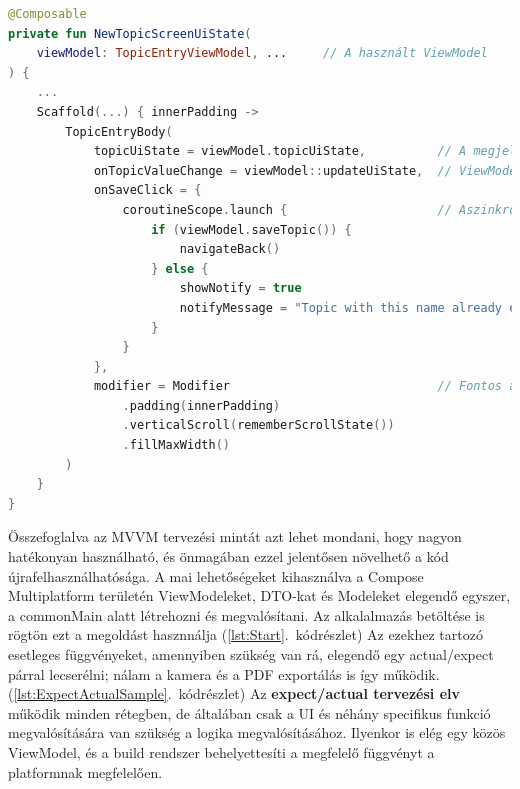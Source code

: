 \begin{lstlisting}[caption={Egy a View rétegbe tartozó felület leírásának részlete}, label={lst:ExampleUI}, language=Kotlin, float]
@Composable
private fun NewTopicScreenUiState(
    viewModel: TopicEntryViewModel, ...     // A használt ViewModel
) {
    ...
    Scaffold(...) { innerPadding ->
        TopicEntryBody(
            topicUiState = viewModel.topicUiState,          // A megjelenítendő UI adat
            onTopicValueChange = viewModel::updateUiState,  // ViewModelben definált függvény paraméterként való átadása
            onSaveClick = {
                coroutineScope.launch {                     // Aszinkron módon történő hívás, mentés funkció. Szintén a ViewModel függvényét hívja meg
                    if (viewModel.saveTopic()) {
                        navigateBack()
                    } else {
                        showNotify = true
                        notifyMessage = "Topic with this name already exists"
                    }
                }
            },
            modifier = Modifier                             // Fontos az igényes megjelenítés
                .padding(innerPadding)
                .verticalScroll(rememberScrollState())
                .fillMaxWidth()
        )
    }
}
\end{lstlisting}


Összefoglalva az MVVM tervezési mintát azt lehet mondani, hogy nagyon hatékonyan használható, és önmagában ezzel jelentősen növelhető a kód újrafelhasználhatósága.  
A mai lehetőségeket kihasználva a Compose Multiplatform területén ViewModeleket, DTO-kat és Modeleket elegendő egyszer, a commonMain alatt létrehozni és megvalósítani.
Az alkalalmazás betöltése is rögtön ezt a megoldást hasznnálja (\ref{lst:Start}.~kódrészlet)
Az ezekhez tartozó esetleges függvényeket, amennyiben szükség van rá, elegendő egy actual/expect párral lecserélni; nálam a kamera és a PDF exportálás is így működik. (\ref{lst:ExpectActualSample}.~kódrészlet)  
Az \textbf{expect/actual tervezési elv} működik minden rétegben, de általában csak a UI és néhány specifikus funkció megvalósítására van szükség a logika megvalósításához.  
Ilyenkor is elég egy közös ViewModel, és a build rendszer behelyettesíti a megfelelő függvényt a platformnak megfelelően.  


